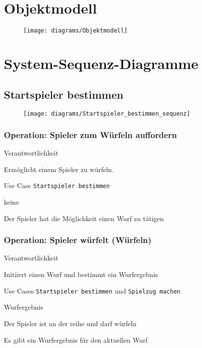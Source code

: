 \newpage
\section{Objektmodell}
\begin{figure}[h]
  \begin{center}
    \texttt{[image: diagrams/Objektmodell]}
  \end{center}
\end{figure}

\newpage
\section{System-Sequenz-Diagramme}
\subsection{Startspieler bestimmen}
\begin{figure}[h]
  \begin{center}
    \texttt{[image: diagrams/Startspieler\_bestimmen\_sequenz]}
  \end{center}
\end{figure}

\subsubsection{Operation: Spieler zum Würfeln auffordern}
\begin{labeling}[:]{Verantwortlichkeit}
\item [Verantwortlichkeit] Ermöglicht einem Spieler zu würfeln.
\item [Referenzen] Use Case \texttt{Startspieler bestimmen}
\item [Output] 
\item [Vorbedingungen] keine
\item [Nachbedingungen] Der Spieler hat die Möglichkeit einen Wurf zu tätigen
\end{labeling}

\subsubsection{Operation: Spieler würfelt (Würfeln)}
\begin{labeling}[:]{Verantwortlichkeit}
\item [Verantwortlichkeit] Initiiert einen Wurf und bestimmt ein Wurfergebnis
\item [Referenzen] Use Cases \texttt{Startspieler bestimmen} und \texttt{Spielzug machen}
\item [Output] Wurfergebnis
\item [Vorbedingungen] Der Spieler ist an der reihe und darf würfeln
\item [Nachbedingungen] Es gibt ein Wurfergebnis für den aktuellen Wurf
\end{labeling}

